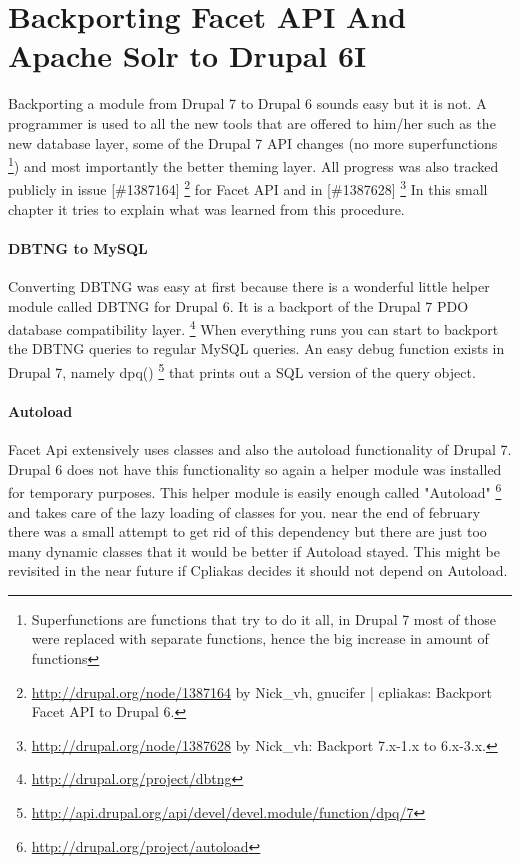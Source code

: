 \section{Backporting Facet API And Apache Solr to Drupal 6I}
Backporting a module from Drupal 7 to Drupal 6 sounds easy but it is not. A programmer is used to all the new tools that are offered to him/her such as the new database layer, some of the Drupal 7 API changes (no more superfunctions \footnote{Superfunctions are functions that try to do it all, in Drupal 7 most of those were replaced with separate functions, hence the big increase in amount of functions}) and most importantly the better theming layer. All progress was also tracked publicly in issue [\#1387164] \footnote{\url{http://drupal.org/node/1387164} by Nick\_vh, gnucifer | cpliakas: Backport Facet API to Drupal 6.} for Facet API and in [\#1387628] \footnote{\url{http://drupal.org/node/1387628} by Nick\_vh: Backport 7.x-1.x to 6.x-3.x.} In this small chapter it tries to explain what was learned from this procedure.

\paragraph{DBTNG to MySQL}
Converting DBTNG was easy at first because there is a wonderful little helper module called DBTNG for Drupal 6. It is a backport of the Drupal 7 PDO database compatibility layer. \footnote{\url{http://drupal.org/project/dbtng}} When everything runs you can start to backport the DBTNG queries to regular MySQL queries. An easy debug function exists in Drupal 7, namely dpq() \footnote{\url{http://api.drupal.org/api/devel/devel.module/function/dpq/7}} that prints out a SQL version of the query object.

\paragraph{Autoload}
Facet Api extensively uses classes and also the autoload functionality of Drupal 7. Drupal 6 does not have this functionality so again a helper module was installed for temporary purposes. This helper module is easily enough called "Autoload" \footnote{\url{http://drupal.org/project/autoload}} and takes care of the lazy loading of classes for you. near the end of february there was a small attempt to get rid of this dependency but there are just too many dynamic classes that it would be better if Autoload stayed. This might be revisited in the near future if Cpliakas decides it should not depend on Autoload.

